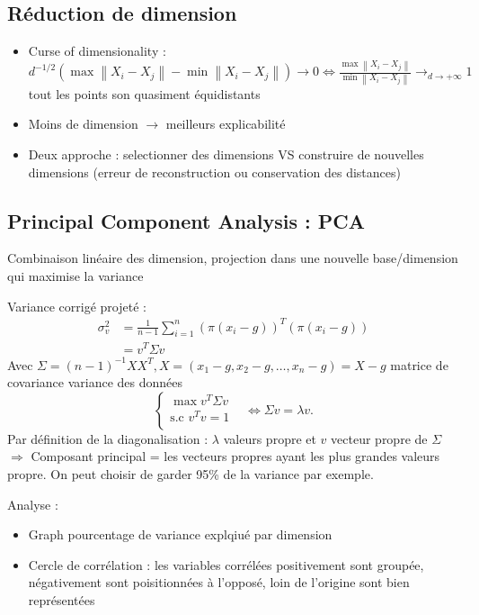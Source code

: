 \documentclass{article}
\begin{document}
\begin{multicols}{2}
\section{Réduction de dimension}
\begin{itemize}
    \item Curse of dimensionality : $ d^{-1/2} (\max \left\| X_i - X_j \right\| - \min \left\| X_i - X_j \right\| ) \to 0 \Leftrightarrow \frac{\max \left\| X_i - X_j \right\| }{\min \left\| X_i - X_j \right\| } \to_{d \to + \infty } 1 $ tout les points son quasiment équidistants  
    \item Moins de dimension $\rightarrow$ meilleurs explicabilité
    \item Deux approche : selectionner des dimensions VS construire de nouvelles dimensions (erreur de reconstruction ou conservation des distances)
\end{itemize}

\subsection{Principal Component Analysis : PCA}
Combinaison linéaire des dimension, projection dans une nouvelle base/dimension qui maximise la variance

Variance corrigé projeté : \begin{align*}
    \sigma _v^2 &= \frac{1}{n-1}\sum_{i=1}^{n}(\pi (x_i - g))^T (\pi (x_i - g)) \\
    &= v^T \Sigma v
\end{align*}
Avec $ \Sigma = (n-1)^{-1} X X^T, X = (x_1 - g, x_2 - g, \dots, x_n - g) = X - g$ matrice de covariance variance des données
\[
    \begin{cases}
    \max v^T \Sigma v &\text{}\\
    \text{s.c } v^T v = 1\\
    \end{cases} \Leftrightarrow \Sigma v = \lambda v
.\]
Par définition de la diagonalisation : $ \lambda $ valeurs propre et $ v $ vecteur propre de $ \Sigma  $ \\
$\Rightarrow $ Composant principal = les vecteurs propres ayant les plus grandes valeurs propre. On peut choisir de garder 95\% de la variance par exemple.

Analyse : \begin{itemize}
    \item Graph pourcentage de variance explqiué par dimension
    \item Cercle de corrélation : les variables corrélées positivement sont groupée, négativement sont poisitionnées à l'opposé, loin de l'origine sont bien représentées
\end{itemize}


\end{multicols}
\end{document}

